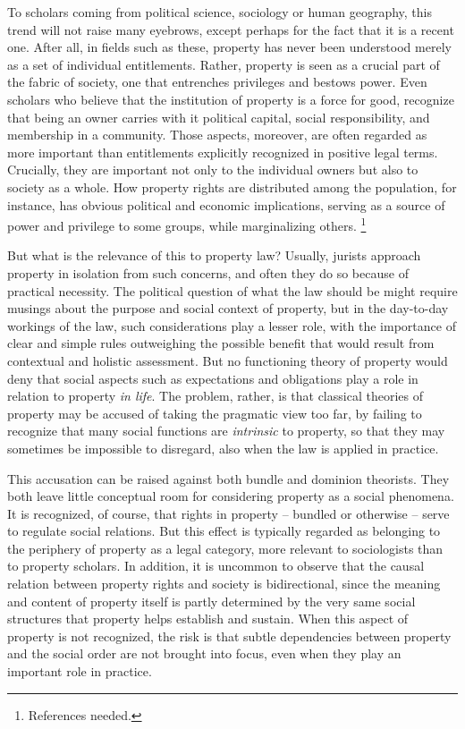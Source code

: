 To scholars coming from political science, sociology or human geography, this trend will not raise many eyebrows, except perhaps for the fact that it is a recent one. After all, in fields such as these, property has never been understood merely as a set of individual entitlements. Rather, property is seen as a crucial part of the fabric of society, one that entrenches privileges and bestows power. Even scholars who believe that the institution of property is a force for good, recognize that being an owner carries with it political capital, social responsibility, and membership in a community. Those aspects, moreover, are often regarded as more important than entitlements explicitly recognized in positive legal terms. Crucially, they are important not only to the individual owners but also to society as a whole. How property rights are distributed among the population, for instance, has obvious political and economic implications, serving as a source of power and privilege to some groups, while marginalizing others. \footnote{References needed.}

But what is the relevance of this to property law? Usually, jurists approach property in isolation from such concerns, and often they do so because of practical necessity. The political question of what the law should be might require musings about the purpose and social context of property, but in the day-to-day workings of the law, such considerations play a lesser role, with the importance of clear and simple rules outweighing the possible benefit that would result from contextual and holistic assessment. But no functioning theory of  property would deny that social aspects such as expectations and obligations play a role in relation to property {\it in life}. The problem, rather, is that classical theories of property may be accused of taking the pragmatic view too far, by failing to recognize that many social functions are {\it intrinsic} to property, so that they may sometimes be impossible to disregard, also when the law is applied in practice.

This accusation can be raised against both bundle and dominion theorists. They both leave little conceptual room for considering property as a social phenomena. It is recognized, of course, that rights in property -- bundled or otherwise -- serve to regulate social relations. But this effect is typically regarded as belonging to the periphery of property as a legal category, more relevant to sociologists than to property scholars. In addition, it is uncommon to observe that the causal relation between property rights and society is bidirectional, since the meaning and content of property itself is partly determined by the very same social structures that property helps establish and sustain. When this aspect of property is not recognized, the risk is that subtle dependencies between property and the social order are not brought into focus, even when they play an important role in practice.

